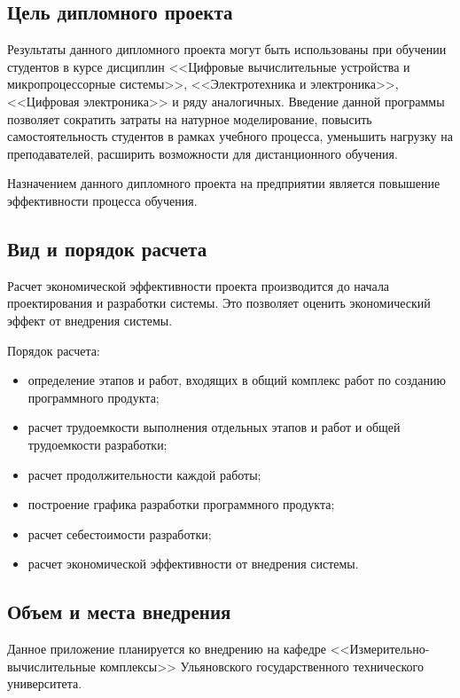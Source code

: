 \subsection{Цель дипломного проекта}
Результаты данного дипломного проекта могут быть использованы при обучении студентов в курсе дисциплин <<Цифровые вычислительные устройства и микропроцессорные системы>>, <<Электротехника и электроника>>, <<Цифровая электроника>> и ряду аналогичных.
Введение данной программы позволяет сократить затраты на натурное моделирование, повысить самостоятельность студентов в рамках учебного процесса, уменьшить нагрузку на преподавателей, расширить возможности для дистанционного обучения.

Назначением данного дипломного проекта на предприятии является повышение эффективности процесса обучения.

\subsection{Вид и порядок расчета}
Расчет экономической эффективности проекта производится до начала проектирования и разработки системы.
Это позволяет оценить экономический эффект от внедрения системы.

Порядок расчета:
\begin{itemize}
  \item определение этапов и работ, входящих в общий комплекс работ по созданию программного продукта;
  \item расчет трудоемкости выполнения отдельных этапов и работ и общей трудоемкости разработки;
  \item расчет продолжительности каждой работы;
  \item построение графика разработки программного продукта;
  \item расчет себестоимости разработки;
  \item расчет экономической эффективности от внедрения системы.
\end{itemize}

\subsection{Объем и места внедрения}
Данное приложение планируется ко внедрению на кафедре <<Измерительно-вычислительные комплексы>> Ульяновского государственного технического университета.

